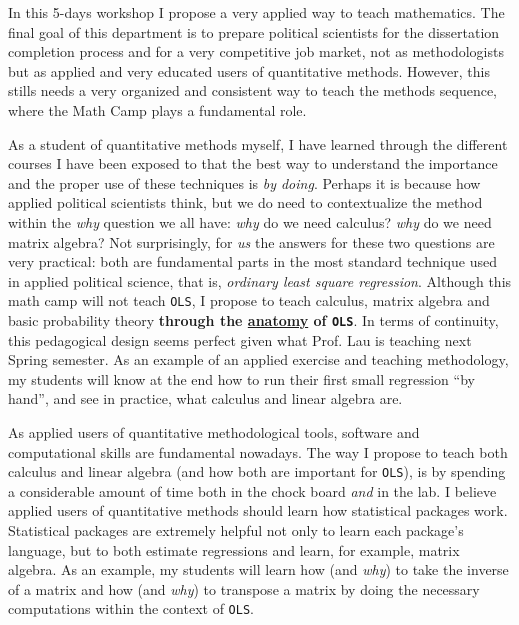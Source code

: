 \documentclass[10pt,stdletter]{newlfm}
\begin{document}
\begin{newlfm}

In this 5-days workshop I propose a very applied way to teach mathematics.
The final goal of this department is to prepare political scientists for the dissertation completion process and for a very competitive job market, not as methodologists but as applied and very educated users of quantitative methods. However, this stills needs a very organized and consistent way to teach the methods sequence, where the Math Camp plays a fundamental role.


As a student of quantitative methods myself, I have learned through the different courses I have been exposed to that the best way to understand the importance and the proper use of these techniques is \emph{by doing}. Perhaps it is because how applied political scientists think, but we do need to contextualize the method within the \emph{why} question we all have: \emph{why} do we need calculus? \emph{why} do we need matrix algebra? Not surprisingly, for \emph{us} the answers for these two questions are very practical: both are  fundamental parts in the most standard technique used in applied political science, that is, \emph{ordinary least square regression}. Although this math camp will not teach \texttt{OLS}, I propose to teach calculus, matrix algebra and basic probability theory {\bf through the \underline{anatomy} of \texttt{OLS}}. In terms of continuity, this pedagogical design seems perfect given what Prof. Lau is teaching next Spring semester. As an example of an applied exercise and teaching methodology, my students will know at the end how to run their first small regression ``by hand'', and see in practice, what calculus and linear algebra are. 


As applied users of quantitative methodological tools, software and computational skills are fundamental nowadays. The way I propose to teach both calculus and linear algebra (and how both are important for \texttt{OLS}), is by spending a considerable amount of time both in the chock board \emph{and} in the lab. I believe applied users of quantitative methods should learn how statistical packages work. Statistical packages are extremely helpful not only to learn each package's language, but to both estimate regressions and learn, for example, matrix algebra. As an example, my students will learn how (and \emph{why}) to take the inverse of a matrix and how (and \emph{why}) to transpose a matrix by doing the necessary computations within the context of \texttt{OLS}.



\end{newlfm}
\end{document}
